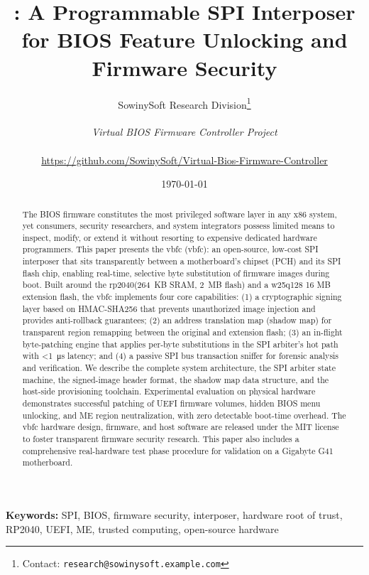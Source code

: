 \documentclass[11pt,a4paper,oneside]{article}
\title{\vbfc: A Programmable \ac{SPI} Interposer for \ac{BIOS} Feature Unlocking and Firmware Security}
\author{
  SowinySoft Research Division\footnote{Contact: \texttt{research@sowinysoft.example.com}}\\\\
  \textit{Virtual BIOS Firmware Controller Project}\\\\
  \url{https://github.com/SowinySoft/Virtual-Bios-Firmware-Controller}
}
\date{\today}
\newcommand{\vbfc}{\gls{vbfc}\xspace}
\newcommand{\rp}{\gls{rp2040}\xspace}
\newcommand{\wq}{\gls{w25q128}\xspace}
\begin{document}
\maketitle

\begin{abstract}
The \ac{BIOS} firmware constitutes the most privileged software layer in any x86 system, yet consumers, security researchers, and system integrators possess limited means to inspect, modify, or extend it without resorting to expensive dedicated hardware programmers. This paper presents the \acf{vbfc} (\vbfc): an open-source, low-cost \ac{SPI} interposer that sits transparently between a motherboard's chipset (\ac{PCH}) and its \ac{SPI} flash chip, enabling real-time, selective byte substitution of firmware images during boot. Built around the \rp (\SI{264}{KB} \ac{SRAM}, \SI{2}{MB} flash) and a \wq 16 MB extension flash, the \vbfc implements four core capabilities: (1) a cryptographic signing layer based on \ac{HMAC}-\ac{SHA}256 that prevents unauthorized image injection and provides anti-rollback guarantees; (2) an address translation map (shadow map) for transparent region remapping between the original and extension flash; (3) an in-flight byte-patching engine that applies per-byte substitutions in the \ac{SPI} arbiter's hot path with \SI{<1}{\micro s} latency; and (4) a passive \ac{SPI} bus transaction sniffer for forensic analysis and verification. We describe the complete system architecture, the \ac{SPI} arbiter state machine, the signed-image header format, the shadow map data structure, and the host-side provisioning toolchain. Experimental evaluation on physical hardware demonstrates successful patching of \ac{UEFI} firmware volumes, hidden \ac{BIOS} menu unlocking, and \ac{ME} region neutralization, with zero detectable boot-time overhead. The \vbfc hardware design, firmware, and host software are released under the MIT license to foster transparent firmware security research. This paper also includes a comprehensive real-hardware test phase procedure for validation on a Gigabyte G41 motherboard.
\end{abstract}

\textbf{Keywords:} \ac{SPI}, \ac{BIOS}, firmware security, interposer, hardware root of trust, \ac{RP2040}, \ac{UEFI}, \ac{ME}, trusted computing, open-source hardware

\tableofcontents
\newpage











\end{document}
